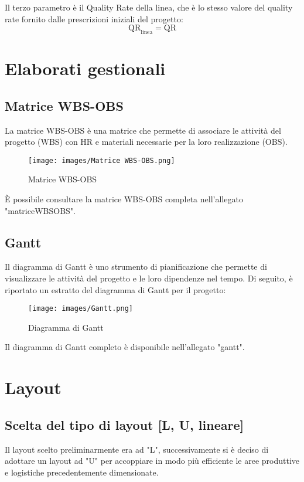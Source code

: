 \documentclass[11pt]{article}
\begin{document}
Il terzo parametro è il Quality Rate della linea, che è lo stesso valore del quality rate fornito dalle prescrizioni iniziali del progetto:
\begin{equation}
    \text{QR}_\text{linea} = \text{QR}
\end{equation}


\newpage


\section{Elaborati gestionali}
\subsection{Matrice WBS-OBS}
La matrice WBS-OBS è una matrice che permette di associare le attività del progetto (WBS) con HR e materiali necessarie per la loro realizzazione (OBS).
\begin{figure} [H]
    \centering
    \texttt{[image: images/Matrice WBS-OBS.png]}
    \caption{Matrice WBS-OBS}
    \label{fig: Matrice WBS-OBS}
\end{figure}

\noindent
È possibile consultare la matrice WBS-OBS completa nell'allegato "{{matriceWBSOBS}}".
\newpage

\subsection{Gantt}
Il diagramma di Gantt è uno strumento di pianificazione che permette di visualizzare le attività del progetto e le loro dipendenze nel tempo.
Di seguito, è riportato un estratto del diagramma di Gantt per il progetto:
\begin{figure} [H]
    \centering
    \texttt{[image: images/Gantt.png]}
    \caption{Diagramma di Gantt}
    \label{fig: Diagramma di Gantt}
\end{figure}

\noindent
Il diagramma di Gantt completo è disponibile nell'allegato "{{gantt}}".
\newpage


\section{Layout}
\subsection{Scelta del tipo di layout [L, U, lineare]}
Il layout scelto preliminarmente era ad "L", successivamente si è deciso di adottare un layout ad "U" per accoppiare in modo più efficiente le aree produttive e logistiche precedentemente dimensionate.
\end{document}
